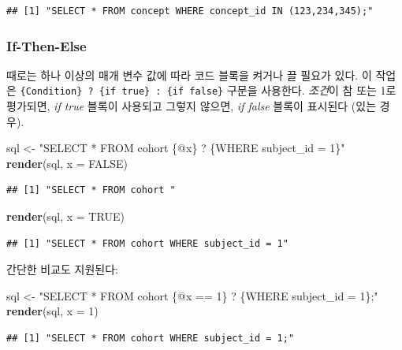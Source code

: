 \documentclass[11pt]{book}
\newenvironment{Shaded}{\begin{snugshade}}{\end{snugshade}}
\newcommand{\KeywordTok}[1]{\textcolor[rgb]{0.13,0.29,0.53}{\textbf{#1}}}
\newcommand{\DataTypeTok}[1]{\textcolor[rgb]{0.13,0.29,0.53}{#1}}
\newcommand{\DecValTok}[1]{\textcolor[rgb]{0.00,0.00,0.81}{#1}}
\newcommand{\StringTok}[1]{\textcolor[rgb]{0.31,0.60,0.02}{#1}}
\newcommand{\OtherTok}[1]{\textcolor[rgb]{0.56,0.35,0.01}{#1}}
\newcommand{\NormalTok}[1]{#1}
\theoremstyle{definition}
\theoremstyle{definition}
\theoremstyle{definition}
\theoremstyle{remark}
\begin{document}
\begin{verbatim}
## [1] "SELECT * FROM concept WHERE concept_id IN (123,234,345);"
\end{verbatim}

\subsubsection*{If-Then-Else}\label{if-then-else}

때로는 하나 이상의 매개 변수 값에 따라 코드 블록을 켜거나 끌 필요가
있다. 이 작업은
\texttt{\{Condition\}\ ?\ \{if\ true\}\ :\ \{if\ false\}} 구문을
사용한다. \emph{조건}이 참 또는 1로 평가되면, \emph{if true} 블록이
사용되고 그렇지 않으면, \emph{if false} 블록이 표시된다 (있는 경우).

\begin{Shaded}
\begin{Highlighting}[]
\NormalTok{sql <-}\StringTok{ "SELECT * FROM cohort \{@x\} ? \{WHERE subject_id = 1\}"}
\KeywordTok{render}\NormalTok{(sql, }\DataTypeTok{x =} \OtherTok{FALSE}\NormalTok{)}
\end{Highlighting}
\end{Shaded}

\begin{verbatim}
## [1] "SELECT * FROM cohort "
\end{verbatim}

\begin{Shaded}
\begin{Highlighting}[]
\KeywordTok{render}\NormalTok{(sql, }\DataTypeTok{x =} \OtherTok{TRUE}\NormalTok{)}
\end{Highlighting}
\end{Shaded}

\begin{verbatim}
## [1] "SELECT * FROM cohort WHERE subject_id = 1"
\end{verbatim}

간단한 비교도 지원된다:

\begin{Shaded}
\begin{Highlighting}[]
\NormalTok{sql <-}\StringTok{ "SELECT * FROM cohort \{@x == 1\} ? \{WHERE subject_id = 1\};"}
\KeywordTok{render}\NormalTok{(sql, }\DataTypeTok{x =} \DecValTok{1}\NormalTok{)}
\end{Highlighting}
\end{Shaded}

\begin{verbatim}
## [1] "SELECT * FROM cohort WHERE subject_id = 1;"
\end{verbatim}
\end{document}
